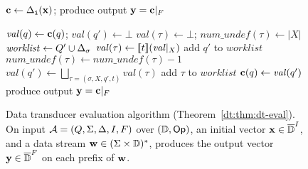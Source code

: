 \begin{figure}[t]
\vspace{-8pt}
\centering \footnotesize
\begin{algorithmic}

\State $\mathbf{c} \gets \Delta_{\texttt{i}}(\mathbf{x})$; produce output $\mathbf{y} = \mathbf{c}|_{F}$

        $\mathit{val}(q) \gets \mathbf{c}(q)$;
        $\mathit{val}(q') \gets \bot$
    \EndFor
        $\mathit{val}(\tau) \gets \bot$;
        $\mathit{num\_undef}(\tau) \gets |X|$
    \EndFor
    \State $\mathit{worklist} \gets Q' \cup \Delta_\sigma$
            \State $\mathit{val}(\tau) \gets \llbracket t \rrbracket(\mathit{val}|_X)$
                add $q'$ to $\mathit{worklist}$
            \EndIf
                    $\mathit{num\_undef}(\tau) \gets \mathit{num\_undef}(\tau) - 1$
                \EndFor
            \EndIf
            \State $\mathit{val}(q') \gets \bigsqcup_{\tau = (\sigma, X, q', t)} \mathit{val}(\tau)$
                    add $\tau$ to $\mathit{worklist}$
                \EndIf
            \EndFor
        \EndIf
    \EndWhile
        $\mathbf{c}(q) \gets \mathit{val}(q')$
    \EndFor
    \State produce output $\mathbf{y} = \mathbf{c}|_{F}$
\EndFor
\end{algorithmic}
\caption[Data transducer evaluation algorithm.]{Data transducer evaluation algorithm (Theorem~\ref{dt:thm:dt-eval}). On input $\mathcal{A} = (Q, \Sigma, \Delta, I, F)$ over $(\mathbb{D}, \textsf{Op})$, an initial vector $\mathbf{x} \in \overline{\mathbb{D}{}}^I$, and a data stream $\mathbf{w} \in (\Sigma \times \mathbb{D})^*$, produces the output vector $\mathbf{y} \in \overline{\mathbb{D}{}}^F$ on each prefix of $\mathbf{w}$.
}
\label{dt:fig:dt-eval-algorithm}
\end{figure}

